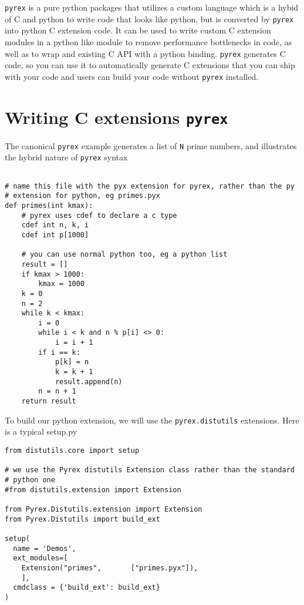 \texttt{pyrex} is a pure python packages that utilizes a custom
language which is a hybid of C and python to write code that looks
like python, but is converted by \texttt{pyrex} into python C
extension code.  It can be used to write custom C extension modules in
a python like module to remove performance bottlenecks in code, as
well as to wrap and existing C API with a python binding.  \texttt{pyrex}
generates C code, so you can use it to automatically generate C
extensions that you can ship with your code and users can build your
code without \texttt{pyrex} installed.

\section{Writing C extensions \texttt{pyrex}}

The canonical \texttt{pyrex} example generates a list of \texttt{N}
prime numbers, and illustrates the hybrid nature of \texttt{pyrex}
syntax

\begin{lstlisting}

# name this file with the pyx extension for pyrex, rather than the py
# extension for python, eg primes.pyx
def primes(int kmax):
    # pyrex uses cdef to declare a c type
    cdef int n, k, i
    cdef int p[1000]

    # you can use normal python too, eg a python list
    result = []
    if kmax > 1000:
        kmax = 1000
    k = 0
    n = 2
    while k < kmax:
        i = 0
        while i < k and n % p[i] <> 0:
            i = i + 1
        if i == k:
            p[k] = n
            k = k + 1
            result.append(n)
        n = n + 1
    return result

\end{lstlisting}

To build our python extension, we will use the \texttt{pyrex.distutils}
extensions.  Here is a typical setup.py

\begin{lstlisting}
from distutils.core import setup

# we use the Pyrex distutils Extension class rather than the standard
# python one
#from distutils.extension import Extension

from Pyrex.Distutils.extension import Extension
from Pyrex.Distutils import build_ext

setup(
  name = 'Demos',
  ext_modules=[
    Extension("primes",       ["primes.pyx"]),
    ],
  cmdclass = {'build_ext': build_ext}
)

\end{lstlisting}

